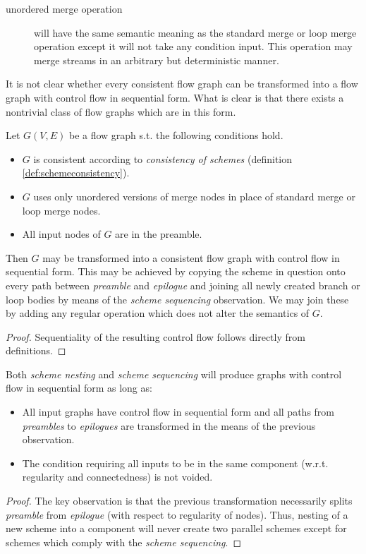 \begin{description}
  \item [unordered merge operation] will have the same semantic meaning as the standard merge or loop merge operation except it will not take any condition input. This operation may merge streams in an arbitrary but deterministic manner.
\end{description}
\myenddef

It is not clear whether every consistent flow graph can be transformed into a flow graph with control flow in sequential form. What is clear is that there exists a nontrivial class of flow graphs which are in this form.

  Let $G(V,E)$ be a flow graph s.t. the following conditions hold.
  \begin{itemize}
    \item $G$ is consistent according to \emph{consistency of schemes} (definition \ref{def:schemeconsistency}).
    \item $G$ uses only unordered versions of merge nodes in place of standard merge or loop merge nodes.
    \item All input nodes of $G$ are in the preamble.
  \end {itemize} 
  Then $G$ may be transformed into a consistent flow graph with control flow in sequential form. This may be achieved by copying the scheme in question onto every path between \emph{preamble} and \emph{epilogue} and joining all newly created branch or loop bodies by means of the \emph{scheme sequencing} observation. We may join these by adding any regular operation which does not alter the semantics of $G$.
  \begin{proof} 
  Sequentiality of the resulting control flow follows directly from definitions.
  \end{proof}
\myendobs

  Both \emph{scheme nesting} and \emph{scheme sequencing} will produce graphs with control flow in sequential form as long as:
  \begin{itemize}
    \item All input graphs have control flow in sequential form and all paths from \emph{preambles} to \emph{epilogues} are transformed in the means of the previous observation.
    \item The condition requiring all inputs to be in the same component (w.r.t. regularity and connectedness) is not voided.
  \end {itemize} 
  \begin{proof} 
  The key observation is that the previous transformation necessarily splits \emph{preamble} from \emph{epilogue} (with respect to regularity of nodes). Thus, nesting of a new scheme into a component will never create two parallel schemes except for schemes which comply with the \emph{scheme sequencing}.
  \end{proof}
\myendobs

